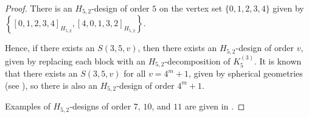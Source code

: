 \begin{proof}
There is an $H_{5,2}$-design of order $5$ on the vertex set $\{0,1,2,3,4\}$
  given by $\left\{[0,1,2,3,4]_{H_{5,2}}, [4, 0, 1, 3, 2]_{H_{5,2}} \right\}$.

Hence, if there exists an $S(3, 5, v)$, then there exists an $H_{5,2}$-design of order $v$, given by replacing each block with an $H_{5,2}$-decomposition of $K_5^{(3)}$.
It is known that there exists an $S(3, 5, v)$ for all $v = 4^m+1$, given by spherical geometries (see \cite{khos-laue}), so there is also an $H_{5,2}$-design of order $4^m+1$.

Examples of $H_{5,2}$-designs of order $7$, $10$, and $11$ are given in \cite{mesz-rosa}.
\end{proof}